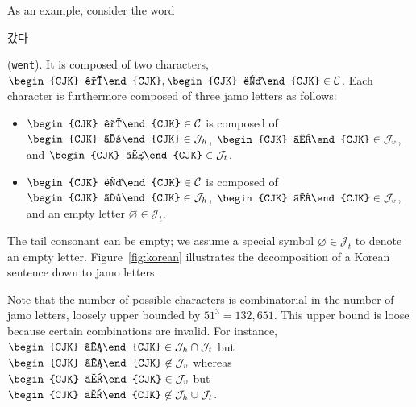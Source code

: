 \documentclass[11pt,letterpaper]{article}
\begin{document}
\begin{CJK}{UTF8}{gbsn}
As an example, consider the word \begin{CJK}{UTF8}{mj}갔다\end{CJK} (\texttt{went}).
It is composed of two characters, $\mbox{\begin{CJK}{UTF8}{mj}갔\end{CJK}}, \mbox{\begin{CJK}{UTF8}{mj}다\end{CJK}} \in \mathcal{C}$.
Each character is furthermore composed of three jamo letters as follows:
\begin{itemize}
\item $\mbox{\begin{CJK}{UTF8}{mj}갔\end{CJK}}  \in \mathcal{C}$  is composed of $\mbox{\begin{CJK}{UTF8}{mj}ㄱ\end{CJK}} \in \mathcal{J}_h$, $\mbox{\begin{CJK}{UTF8}{mj}ㅏ\end{CJK}} \in \mathcal{J}_v$, and $\mbox{\begin{CJK}{UTF8}{mj}ㅆ\end{CJK}} \in \mathcal{J}_t$.
\item $\mbox{\begin{CJK}{UTF8}{mj}다\end{CJK}} \in \mathcal{C}$ is composed of $\mbox{\begin{CJK}{UTF8}{mj}ㄷ\end{CJK}}  \in \mathcal{J}_h$, $\mbox{\begin{CJK}{UTF8}{mj}ㅏ\end{CJK}} \in \mathcal{J}_v$, and an empty letter $\mbox{$\varnothing$} \in \mathcal{J}_t$.
\end{itemize}
The tail consonant can be empty; we assume a special symbol $\mbox{$\varnothing$} \in \mathcal{J}_t$ to denote an empty letter.
Figure~\ref{fig:korean} illustrates the decomposition of a Korean sentence down to jamo letters.

Note that the number of possible characters is combinatorial in the number of jamo letters, loosely upper bounded by $51^3 = 132,651$.
This upper bound is loose because certain combinations are invalid.
For instance, $\mbox{\begin{CJK}{UTF8}{mj}ㅁ\end{CJK}} \in \mathcal{J}_h \cap \mathcal{J}_t$
but $\mbox{\begin{CJK}{UTF8}{mj}ㅁ\end{CJK}} \not\in \mathcal{J}_v$
whereas $\mbox{\begin{CJK}{UTF8}{mj}ㅏ\end{CJK}} \in \mathcal{J}_v$ but $\mbox{\begin{CJK}{UTF8}{mj}ㅏ\end{CJK}} \not\in \mathcal{J}_h \cup \mathcal{J}_t$.


\end{CJK}
\end{document}

